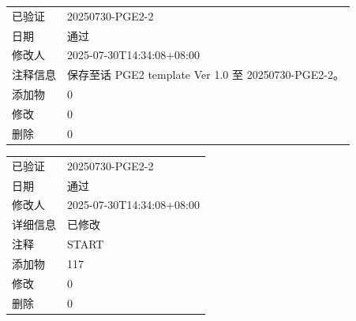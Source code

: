 \documentclass[UTF8,10pt,a4paper,fontset=fandol]{ctexart}
\newcommand{\fieldvalue}[1]{#1}
\begin{document}
\begin{center}
\begin{center}
\medskip


\begin{tabular}{@{}ll@{}}
已验证 &
\fieldvalue{20250730-PGE2-2}\\
日期 &
\fieldvalue{通过}\\
修改人 &
\fieldvalue{2025-07-30T14:34:08+08:00}\\
注释信息 &
\fieldvalue{保存至话 PGE2 template Ver 1.0 至 20250730-PGE2-2。}\\
添加物 &
\fieldvalue{0}\\
修改 &
\fieldvalue{0}\\
删除 &
\fieldvalue{0}\\
\end{tabular}

\medskip


\begin{tabular}{@{}ll@{}}
已验证 &
\fieldvalue{20250730-PGE2-2}\\
日期 &
\fieldvalue{通过}\\
修改人 &
\fieldvalue{2025-07-30T14:34:08+08:00}\\
详细信息 &
\fieldvalue{已修改}\\
注释 &
\fieldvalue{START}\\
添加物 &
\fieldvalue{117}\\
修改 &
\fieldvalue{0}\\
删除 &
\fieldvalue{0}\\
\end{tabular}

\medskip



\end{center}
\end{center}
\end{document}

